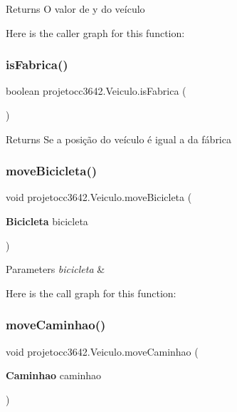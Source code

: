 \begin{DoxyReturn}{Returns}
O valor de y do veículo 
\end{DoxyReturn}
Here is the caller graph for this function\+:
\mbox{\label{classprojetocc3642_1_1_veiculo_a94646a2aae56278b0b9ab17534b0af1b}} 
\subsubsection{is\+Fabrica()}
{\footnotesize\ttfamily boolean projetocc3642.\+Veiculo.\+is\+Fabrica (\begin{DoxyParamCaption}{ }\end{DoxyParamCaption})}

\begin{DoxyReturn}{Returns}
Se a posição do veículo é igual a da fábrica 
\end{DoxyReturn}
\mbox{\label{classprojetocc3642_1_1_veiculo_ab97097adda5bd18a0bac944035629c5f}} 
\subsubsection{move\+Bicicleta()}
{\footnotesize\ttfamily void projetocc3642.\+Veiculo.\+move\+Bicicleta (\begin{DoxyParamCaption}\item[{\textbf{ Bicicleta}}]{bicicleta }\end{DoxyParamCaption})}


\begin{DoxyParams}{Parameters}
{\em bicicleta} & \\
\hline
\end{DoxyParams}
Here is the call graph for this function\+:
\mbox{\label{classprojetocc3642_1_1_veiculo_a85b1534b28cecd7a9e0f1ee0f14c974a}} 
\subsubsection{move\+Caminhao()}
{\footnotesize\ttfamily void projetocc3642.\+Veiculo.\+move\+Caminhao (\begin{DoxyParamCaption}\item[{\textbf{ Caminhao}}]{caminhao }\end{DoxyParamCaption})}



